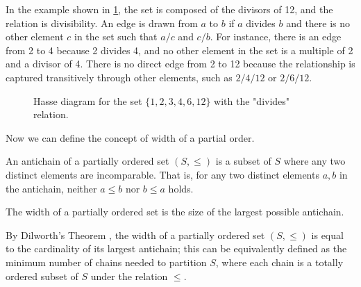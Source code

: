 \begin{example} \label{ex:hasse}
    In the example shown in \cref{fig:hasse_diagram_example}, the set is composed of the divisors of 12, and the relation is divisibility. An edge is drawn from $a$ to $b$ if $a$ divides $b$ and there is no other element $c$ in the set such that $a/c$ and $c/b$. For instance, there is an edge from 2 to 4 because 2 divides 4, and no other element in the set is a multiple of 2 and a divisor of 4. There is no direct edge from 2 to 12 because the relationship is captured transitively through other elements, such as $2/4/12$ or $2/6/12$.
    \begin{figure}[H]
        \centering
        \caption{Hasse diagram for the set $\{1, 2, 3, 4, 6, 12\}$ with the "divides" relation.}
        \label{fig:hasse_diagram_example}
    \end{figure}
\end{example}

Now we can define the concept of width of a partial order.

\begin{definition}[Antichain]
    An antichain of a partially ordered set $(S, \leq)$ is a subset of $S$ where any two distinct elements are incomparable. That is, for any two distinct elements $a, b$ in the antichain, neither $a \leq b$ nor $b \leq a$ holds.
\end{definition}

\begin{definition}
    The width of a partially ordered set is the size of the largest possible antichain.
\end{definition}

By Dilworth's Theorem \cite{dilworth1990decomposition}, the width of a partially ordered set $(S, \leq)$ is equal to the cardinality of its largest antichain; this can be equivalently defined as the minimum number of chains needed to partition $S$, where each chain is a totally ordered subset of $S$ under the relation $\leq$. 

